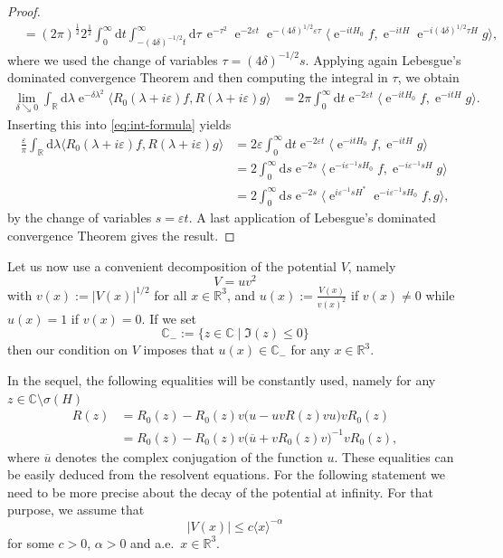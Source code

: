 \documentclass{article}
\def\C{\mathbb C}
\def\d{\mathrm{d}}
\def\R{\mathbb R}
\def\e{\mathop{\mathrm{e}}\nolimits}
\begin{document}
\begin{proof}
\begin{align*}
&= (2\pi)^{\frac12} 2^\frac12 \int_0^\infty \d t \int_{-(4\delta)^{-1/2}t}^\infty \d \tau \,  \e^{-\tau^2} \e^{-2\varepsilon t} \e^{-(4\delta)^{1/2}\varepsilon \tau}  \langle \e^{-itH_0}f, \e^{-itH} \e^{-i(4\delta)^{1/2}\tau H} g\rangle ,
\end{align*}
where we used the change of variables $\tau=(4\delta)^{-1/2}s$. Applying again Lebesgue's dominated convergence Theorem and then computing the integral in $\tau$, we obtain
\begin{align*}
\lim_{\delta\searrow 0}\int_{\R}\d \lambda \e^{-\delta\lambda^2} \langle R_0(\lambda+i \varepsilon)f, R(\lambda + i \varepsilon) g\rangle &= 2\pi \int_0^\infty \d t \e^{-2\varepsilon t}  \langle \e^{-itH_0}f, \e^{-itH} g\rangle.
\end{align*}
Inserting this into \eqref{eq:int-formula} yields
\begin{align*}
\frac{\varepsilon}{\pi} \int_{\R}\d \lambda \langle R_0(\lambda+i \varepsilon)f, R(\lambda + i \varepsilon) g\rangle &= 2\varepsilon \int_0^\infty \d t \e^{-2\varepsilon t}  \langle \e^{-itH_0}f, \e^{-itH} g\rangle\\
&= 2 \int_0^\infty \d s \e^{-2s}  \langle \e^{-i\varepsilon^{-1}sH_0}f, \e^{-i\varepsilon^{-1}sH} g\rangle \\
&= 2 \int_0^\infty \d s \e^{-2s}  \langle \e^{i\varepsilon^{-1}sH^*} \e^{-i\varepsilon^{-1}sH_0}f,  g\rangle ,
\end{align*}
by the change of variables $s=\varepsilon t$. A last application of Lebesgue's dominated convergence Theorem gives the result.
\end{proof}

Let us now use a convenient decomposition of the potential $V$, namely
$$
V=u v^2
$$
with $v(x):=|V(x)|^{1/2}$ for all $x\in \R^3$, and $u(x):=\frac{V(x)}{v(x)^2}$ if $v(x)\neq 0$
while $u(x)=1$ if $v(x)=0$. 
If we set 
$$
\C_-:=\{z\in \C\mid \Im(z)\leq 0\}
$$
then our condition on $V$ imposes that $u(x)\in \C_-$ for any $x\in \R^3$.

In the sequel, the following equalities will be constantly used, namely for any $z\in  \C \setminus \sigma(H)$
\begin{align}\label{eq_resolv_eq}
\nonumber R(z)
& = R_0(z)-R_0(z) v\big(u- uvR(z)vu\big)vR_0(z) \\
& = R_0(z)-R_0(z) v \big(\overline{u} +v R_0(z)v\big)^{-1}vR_0(z), 
\end{align}
where $\overline{u}$ denotes the complex conjugation of the function $u$.
These equalities can be easily deduced from the resolvent equations.
For the following statement we need to be more precise about the decay of the potential
at infinity. For that purpose, we assume that
\begin{equation}\label{eq_decay_V}
|V(x)|\leq c \langle x\rangle^{-\alpha}
\end{equation}
for some $c>0$, $\alpha>0$ and a.e.~$x\in \R^3$.
\end{document}
